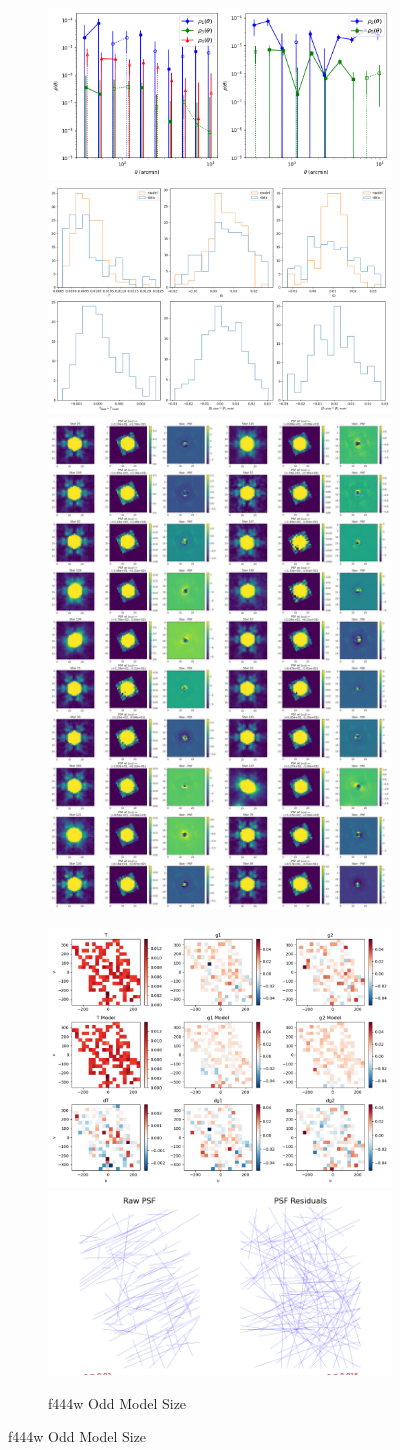 \documentclass[a4 paper]{article}
\numberwithin{equation}{section}
\newcommand{\0}{\mathbf{0}}
\begin{document}
\begin{figure}[!h]
  \begin{subfigure}{\linewidth}
  \includegraphics[width=.3\linewidth]{444wOdd/piff_rho.png}\hfill
  \includegraphics[width=.3\linewidth]{444wOdd/piff_shapes.png}\hfill
  \includegraphics[width=.3\linewidth]{444wOdd/piff_stars.png}
  \end{subfigure}\par\medskip
  \begin{subfigure}{\linewidth}
  \includegraphics[width=.3\linewidth]{444wOdd/piff_twod.png}\hfill
  \includegraphics[width=.3\linewidth]{444wOdd/piff_whisker.png}\hfill
  \caption{f444w Odd Model Size}
  \end{subfigure}\par\medskip
\end{figure}\\ \newpage
\end{document}
